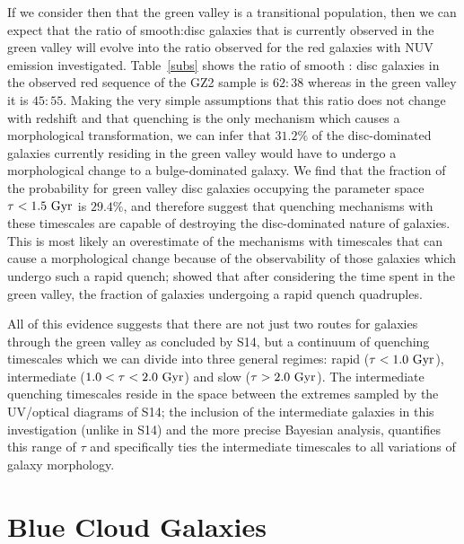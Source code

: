 If we consider then that the green valley is a transitional population, then we can expect that the ratio of smooth:disc galaxies that is currently observed in the green valley will evolve into the ratio observed for the red galaxies with NUV emission investigated. Table~\ref{subs} shows the ratio of smooth : disc galaxies in the observed red sequence of the GZ2 sample is $62:38$ whereas in the green valley it is $45:55$. Making the very simple assumptions that this ratio does not change with redshift and that quenching is the only mechanism which causes a morphological transformation, we can infer that $31.2\%$ of the disc-dominated galaxies currently residing in the green valley would have to undergo a morphological change to a bulge-dominated galaxy. We find that the fraction of the probability for green valley disc galaxies occupying the parameter space $\tau < 1.5 ~\rm{Gyr}$ is $29.4\%$, and therefore suggest that quenching mechanisms with these timescales are capable of destroying the disc-dominated nature of galaxies. This is most likely an overestimate of the mechanisms with timescales that can cause a morphological change because of the observability of those galaxies which undergo such a rapid quench; \citet{Martin07} showed that after considering the time spent in the green valley, the fraction of galaxies undergoing a rapid quench quadruples.

All of this evidence suggests that there are not just two routes for galaxies through the green valley as concluded by S14, but a continuum of quenching timescales which we can divide into three general regimes: rapid ($\tau < 1.0 ~\rm{Gyr}$), intermediate ($1.0 < \tau < 2.0~\rm{Gyr}$) and slow ($\tau > 2.0~\rm{Gyr}$). The intermediate quenching timescales reside in the space between the extremes sampled by the UV/optical diagrams of S14; the inclusion of the intermediate galaxies in this investigation (unlike in S14) and the more precise Bayesian analysis, quantifies this range of $\tau$ and specifically ties the intermediate timescales to all variations of galaxy morphology.


\section{Blue Cloud Galaxies}\label{bc}


